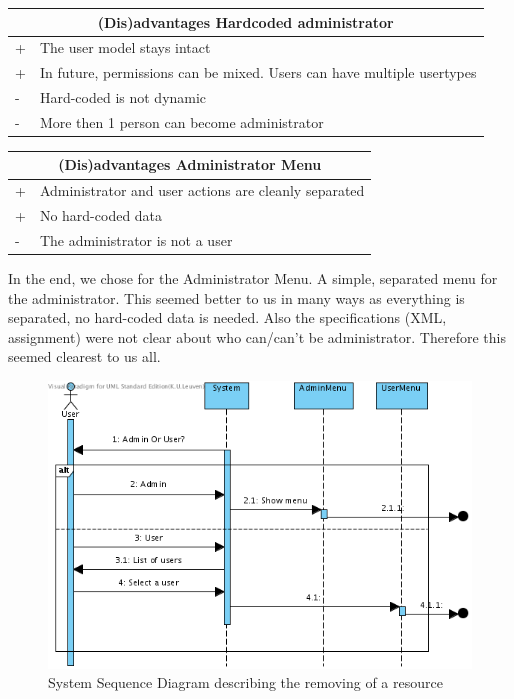 			\begin{tabular}{|l|l|}
				\hline
				\multicolumn{2}{|c|}{(Dis)advantages Hardcoded administrator} \\
				\hline
				+ & The user model stays intact\\
				+ & In future, permissions can be mixed. Users can have multiple usertypes\\
				\hline
				- & Hard-coded is not dynamic\\
				- & More then 1 person can become administrator\\
				\hline
			\end{tabular}
			
			\begin{tabular}{|l|l|}
				\hline
				\multicolumn{2}{|c|}{(Dis)advantages Administrator Menu} \\
				\hline
				+ & Administrator and user actions are cleanly separated\\
				+ & No hard-coded data\\
				\hline
				- & The administrator is not a user\\
				\hline
			\end{tabular}
			
			In the end, we chose for the Administrator Menu. A simple, separated menu for the administrator. This seemed better to us in many ways as everything is separated, no hard-coded data is needed. Also the specifications (XML, assignment) were not clear about who can/can't be administrator. Therefore this seemed clearest to us all.
			\begin{figure}[H]
				\begin{center}
					\includegraphics[scale=0.5]{images/ssd_log_in.png}
				\end{center}
				\caption{System Sequence Diagram describing the removing of a resource}
			\end{figure}
